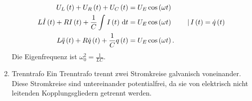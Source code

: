 \begin{enumerate}[label=--]
\begin{align}
                        U_L\left(t\right)+U_R\left(t\right)+U_C\left(t\right)&=U_E\cos \left(\omega t\right)\\
                        L\dot{I}\left(t\right)+RI\left(t\right)+\dfrac{1}{C}\int_{}^{}I\left(t\right)\,\text{d} t&=U_E\cos \left(\omega t\right)\qquad \,|\, I\left(t\right)=\dot{q}\left(t\right)\\
                        L\ddot{q}\left(t\right)+R\dot{q}\left(t\right)+\dfrac{1}{C}q\left(t\right)&=U_E\cos \left(\omega t\right)
                .\end{align} 
                Die Eigenfrequenz ist $\omega _0^2=\tfrac{1}{LC}$.
        \item Trenntrafo \hspace{25pt}
                Ein Trenntrafo trennt zwei Stromkreise galvanisch voneinander. 
                Diese Stromkreise sind untereinander potentialfrei, da sie von elektrisch nicht leitenden Kopplungsgliedern getrennt werden.
\end{enumerate}

\newpage
